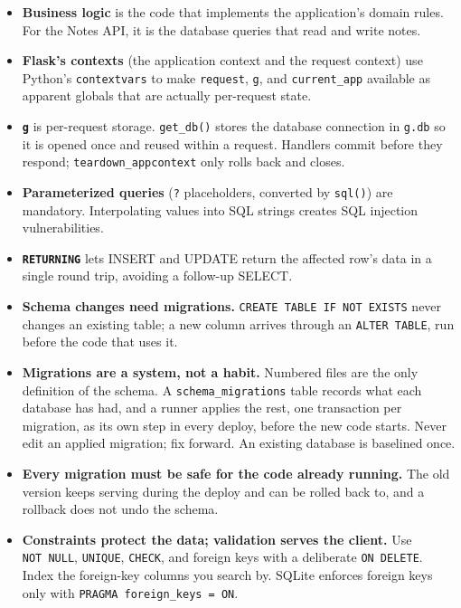 \label{33-logic-execution:key-takeaways}
\begin{takeaways}

\begin{itemize}
\tightlist
\item
  \textbf{Business logic} is the code that implements the application's domain rules. For the Notes API, it is the database queries that read and write notes.
\item
  \textbf{Flask's contexts} (the application context and the request context) use Python's \texttt{contextvars} to make \texttt{request}, \texttt{g}, and \texttt{current\_app} available as apparent globals that are actually per-request state.
\item
  \textbf{\texttt{g}} is per-request storage. \texttt{get\_db()} stores the database connection in \texttt{g.db} so it is opened once and reused within a request. Handlers commit before they respond; \texttt{teardown\_appcontext} only rolls back and closes.
\item
  \textbf{Parameterized queries} (\texttt{?} placeholders, converted by \texttt{sql()}) are mandatory. Interpolating values into SQL strings creates SQL injection vulnerabilities.
\item
  \textbf{\texttt{RETURNING}} lets INSERT and UPDATE return the affected row's data in a single round trip, avoiding a follow-up SELECT.
\item
  \textbf{Schema changes need migrations.} \texttt{CREATE\ TABLE\ IF\ NOT\ EXISTS} never changes an existing table; a new column arrives through an \texttt{ALTER\ TABLE}, run before the code that uses it.
\item
  \textbf{Migrations are a system, not a habit.} Numbered files are the only definition of the schema. A \texttt{schema\_migrations} table records what each database has had, and a runner applies the rest, one transaction per migration, as its own step in every deploy, before the new code starts. Never edit an applied migration; fix forward. An existing database is baselined once.
\item
  \textbf{Every migration must be safe for the code already running.} The old version keeps serving during the deploy and can be rolled back to, and a rollback does not undo the schema.
\item
  \textbf{Constraints protect the data; validation serves the client.} Use \texttt{NOT\ NULL}, \texttt{UNIQUE}, \texttt{CHECK}, and foreign keys with a deliberate \texttt{ON\ DELETE}. Index the foreign-key columns you search by. SQLite enforces foreign keys only with \texttt{PRAGMA\ foreign\_}\allowbreak{}\texttt{keys\ =}\allowbreak{}\texttt{\ ON}.

\end{itemize}
\end{takeaways}
